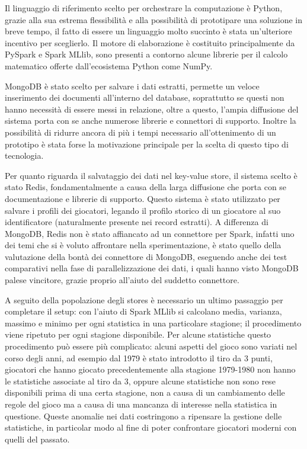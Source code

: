 \documentclass[10.5pt,a4paper,twocolumn]{article}
\begin{document}
Il linguaggio di riferimento scelto per orchestrare la computazione è Python, grazie alla sua estrema flessibilità e alla possibilità di prototipare una soluzione in breve tempo, il fatto di essere un linguaggio molto succinto è stata un'ulteriore incentivo per sceglierlo. Il motore di elaborazione è costituito principalmente da PySpark e Spark MLlib, sono presenti a contorno alcune librerie per il calcolo matematico offerte dall'ecosistema Python come NumPy.

MongoDB è stato scelto per salvare i dati estratti, permette un veloce inserimento dei documenti all'interno del database, soprattutto se questi non hanno necessità di essere messi in relazione, oltre a questo, l'ampia diffusione del sistema porta con se anche numerose librerie e connettori di supporto.
Inoltre la possibilità di ridurre ancora di più i tempi necessario all'ottenimento di un prototipo è stata forse la motivazione principale per la scelta di questo tipo di tecnologia.

Per quanto riguarda il salvataggio dei dati nel key-value store, il sistema scelto è stato Redis, fondamentalmente a causa della larga diffusione che porta con se documentazione e librerie di supporto. Questo sistema è stato utilizzato per salvare i profili dei giocatori, legando il profilo storico di un giocatore al suo identificatore (naturalmente presente nei record estratti). A differenza di MongoDB, Redis non è stato affiancato ad un connettore per Spark, infatti uno dei temi che si è voluto affrontare nella sperimentazione, è stato quello della valutazione della bontà dei connettore di MongoDB, eseguendo anche dei test comparativi nella fase di parallelizzazione dei dati, i quali hanno visto MongoDB palese vincitore, grazie proprio all'aiuto del suddetto connettore.

A seguito della popolazione degli stores è necessario un ultimo passaggio per completare il setup: con l'aiuto di Spark MLlib si calcolano media, varianza, massimo e minimo per ogni statistica in una particolare stagione; il procedimento viene ripetuto per ogni stagione disponibile. Per alcune statistiche questo procedimento può essere più complicato: alcuni aspetti del gioco sono variati nel corso degli anni, ad esempio dal 1979 è stato introdotto il tiro da 3 punti, giocatori che hanno giocato precedentemente alla stagione 1979-1980 non hanno le statistiche associate al tiro da 3, oppure alcune statistiche non sono rese disponibili prima di una certa stagione, non a causa di un cambiamento delle regole del gioco ma a causa di una mancanza di interesse nella statistica in questione. Queste anomalie nei dati costringono a ripensare la gestione delle statistiche, in particolar modo al fine di poter confrontare giocatori moderni con quelli del passato.
\end{document}
